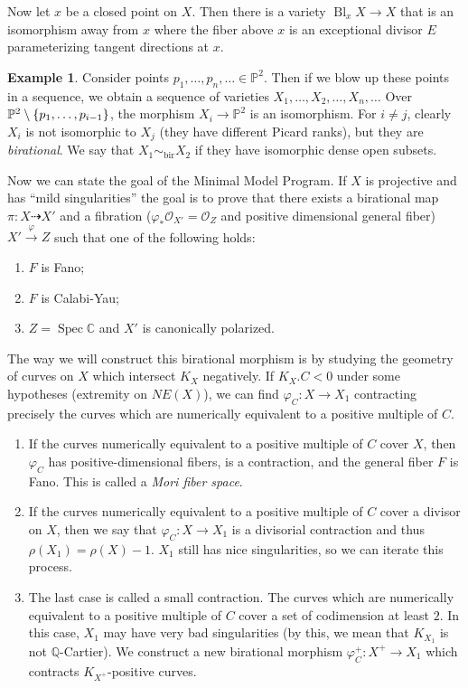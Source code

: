 \documentclass[leqno, openany]{memoir}
\theoremstyle{definition}
\newtheorem{exm}[thm]{Example}
\theoremstyle{remark}
\theoremstyle{plain}
\theoremstyle{definition}
\theoremstyle{remark}
\newcommand{\C}{\mathbb{C}}
\newcommand{\Q}{\mathbb{Q}}
\renewcommand{\P}{\mathbb{P}}
\newcommand{\mc}[1]{\mathcal{#1}}
\newcommand{\mr}[1]{\mathrm{#1}}
\newcommand{\bir}{\sim_{\mr{bir}}}
\DeclareMathOperator{\Bl}{Bl}
\DeclareMathOperator{\Spec}{Spec}
\begin{document}
Now let $x$ be a closed point on $X$. Then there is a variety $\Bl_x X \to X$ that is an isomorphism away from $x$ where the fiber above $x$ is an exceptional divisor $E$ parameterizing tangent directions at $x$.

\begin{exm}
    Consider points $p_1, \ldots, p_n, \ldots \in \P^2$. Then if we blow up these points in a sequence, we obtain a sequence of varieties $X_1, \ldots, X_2, \ldots, X_n, \ldots$ Over $\P^2 \setminus \qty{p_1, \ldots, p_{i-1}}$, the morphism $X_i \to \P^2$ is an isomorphism. For $i \neq j$, clearly $X_i$ is not isomorphic to $X_j$ (they have different Picard ranks), but they are \textit{birational}. We say that $X_1 \bir X_2$ if they have isomorphic dense open subsets.
\end{exm}

Now we can state the goal of the Minimal Model Program. If $X$ is projective and has ``mild singularities'' the goal is to prove that there exists a birational map $\pi \colon X \dashrightarrow X'$ and a fibration ($\varphi_* \mc{O}_{X'} = \mc{O}_Z$ and positive dimensional general fiber) $X' \xrightarrow{\varphi} Z$ such that one of the following holds:
\begin{enumerate}
    \item $F$ is Fano;
    \item $F$ is Calabi-Yau;
    \item $Z = \Spec \C$ and $X'$ is canonically polarized.
\end{enumerate}
The way we will construct this birational morphism is by studying the geometry of curves on $X$ which intersect $K_X$ negatively. If $K_X.C < 0$ under some hypotheses (extremity on $NE(X)$), we can find $\varphi_C \colon X \to X_1$ contracting precisely the curves which are numerically equivalent to a positive multiple of $C$.

\begin{enumerate}
    \item If the curves numerically equivalent to a positive multiple of $C$ cover $X$, then $\varphi_C$ has positive-dimensional fibers, is a contraction, and the general fiber $F$ is Fano. This is called a \textit{Mori fiber space}.
    \item If the curves numerically equivalent to a positive multiple of $C$ cover a divisor on $X$, then we say that $\varphi_C \colon X \to X_1$ is a divisorial contraction and thus $\rho(X_1) = \rho(X) - 1$. $X_1$ still has nice singularities, so we can iterate this process.
    \item The last case is called a small contraction. The curves which are numerically equivalent to a positive multiple of $C$ cover a set of codimension at least $2$. In this case, $X_1$ may have very bad singularities (by this, we mean that $K_{X_1}$ is not $\Q$-Cartier). We construct a new birational morphism $\varphi_C^+ \colon X^+ \to X_1$ which contracts $K_{X^+}$-positive curves.
\end{enumerate}
\end{document}
